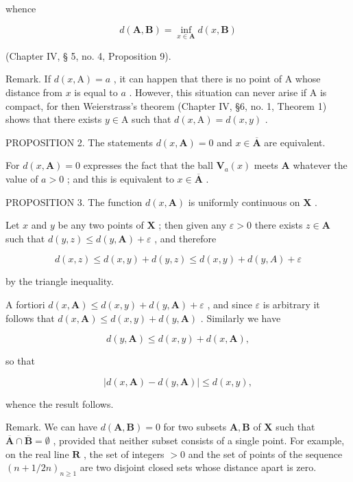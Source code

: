 whence

\[
d (\mathbf {A}, \mathbf {B}) = \inf _ {x \in \mathbf {A}} d (x, \mathbf {B})
\]

(Chapter IV, § 5, no. 4, Proposition 9).

Remark. If \(d(x, \mathrm{A}) = a\) , it can happen that there is no point of A whose distance from \(x\) is equal to \(a\) . However, this situation can never arise if A is compact, for then Weierstrass's theorem (Chapter IV, §6, no. 1, Theorem 1) shows that there exists \(y \in \mathrm{A}\) such that \(d(x, \mathrm{A}) = d(x, y)\) .

PROPOSITION 2. The statements \(d(x, \mathbf{A}) = 0\) and \(x \in \overline{\mathbf{A}}\) are equivalent.

For \(d(x, \mathbf{A}) = 0\) expresses the fact that the ball \(\mathbf{V}_a(x)\) meets \(\mathbf{A}\) whatever the value of \(a > 0\) ; and this is equivalent to \(x \in \overline{\mathbf{A}}\) .

PROPOSITION 3. The function \(d(x, \mathbf{A})\) is uniformly continuous on \(\mathbf{X}\) .

Let \(x\) and \(y\) be any two points of \(\mathbf{X}\) ; then given any \(\varepsilon > 0\) there exists \(z \in \mathbf{A}\) such that \(d(y, z) \leqslant d(y, \mathbf{A}) + \varepsilon\) , and therefore

\[
d (x, z) \leqslant d (x, y) + d (y, z) \leqslant d (x, y) + d (y, A) + \varepsilon
\]

by the triangle inequality.

A fortiori \(d(x, \mathbf{A}) \leqslant d(x, y) + d(y, \mathbf{A}) + \varepsilon\) , and since \(\varepsilon\) is arbitrary it follows that \(d(x, \mathbf{A}) \leqslant d(x, y) + d(y, \mathbf{A})\) . Similarly we have

\[
d (y, \mathbf {A}) \leqslant d (x, y) + d (x, \mathbf {A}),
\]

so that

\[
\left| d (x, \mathbf {A}) - d (y, \mathbf {A}) \right| \leqslant d (x, y),\tag{2}
\]

whence the result follows.

Remark. We can have \(d(\mathbf{A}, \mathbf{B}) = 0\) for two subsets \(\mathbf{A}, \mathbf{B}\) of \(\mathbf{X}\) such that \(\overline{\mathbf{A}} \cap \overline{\mathbf{B}} = \emptyset\) , provided that neither subset consists of a single point. For example, on the real line \(\mathbf{R}\) , the set of integers \(> 0\) and the set of points of the sequence \((n + 1/2n)_{n \geqslant 1}\) are two disjoint closed sets whose distance apart is zero.

